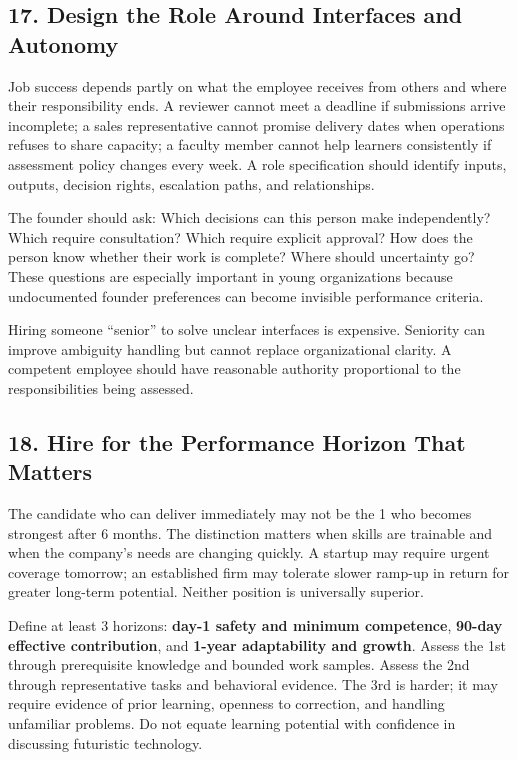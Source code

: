 \subsection*{17. Design the Role Around Interfaces and Autonomy}

Job success depends partly on what the employee receives from others and where their responsibility ends. A reviewer cannot meet a deadline if submissions arrive incomplete; a sales representative cannot promise delivery dates when operations refuses to share capacity; a faculty member cannot help learners consistently if assessment policy changes every week. A role specification should identify inputs, outputs, decision rights, escalation paths, and relationships.

The founder should ask: Which decisions can this person make independently? Which require consultation? Which require explicit approval? How does the person know whether their work is complete? Where should uncertainty go? These questions are especially important in young organizations because undocumented founder preferences can become invisible performance criteria.

Hiring someone ``senior'' to solve unclear interfaces is expensive. Seniority can improve ambiguity handling but cannot replace organizational clarity. A competent employee should have reasonable authority proportional to the responsibilities being assessed.

\subsection*{18. Hire for the Performance Horizon That Matters}

The candidate who can deliver immediately may not be the 1 who becomes strongest after 6 months. The distinction matters when skills are trainable and when the company's needs are changing quickly. A startup may require urgent coverage tomorrow; an established firm may tolerate slower ramp-up in return for greater long-term potential. Neither position is universally superior.

Define at least 3 horizons: \textbf{day-1 safety and minimum competence}, \textbf{90-day effective contribution}, and \textbf{1-year adaptability and growth}. Assess the 1st through prerequisite knowledge and bounded work samples. Assess the 2nd through representative tasks and behavioral evidence. The 3rd is harder; it may require evidence of prior learning, openness to correction, and handling unfamiliar problems. Do not equate learning potential with confidence in discussing futuristic technology.

